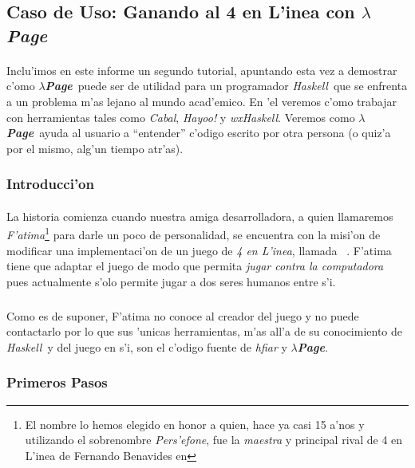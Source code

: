 \documentclass[a4paper]{article}
\newcommand{\haskell}{\textsl{Haskell}}
\newcommand{\hpage}{\textbf{\textsl{$\lambda$Page}}}
\newcommand{\cabal}{\textsl{Cabal}}
\begin{document}
\newpage
\subsection{Caso de Uso: Ganando al 4 en L'inea con \hpage}
\begin{epigraphs}
\end{epigraphs}
\paragraph{}Inclu'imos en este informe un segundo tutorial, apuntando esta vez a demostrar c'omo \hpage\ puede ser de utilidad para un programador \haskell\ que se enfrenta a un problema m'as lejano al mundo acad'emico.  En 'el veremos c'omo trabajar con herramientas tales como \cabal, \textsl{Hayoo!} y \textsl{wxHaskell}.  Veremos como \hpage\ ayuda al usuario a ``entender'' c'odigo escrito por otra persona (o quiz'a por el mismo, alg'un tiempo atr'as).
\subsubsection{Introducci'on}
\paragraph{}La historia comienza cuando nuestra amiga desarrolladora, a quien llamaremos \textsl{F'atima}\footnote{El nombre lo hemos elegido en honor a quien, hace ya casi 15 a'nos y utilizando el sobrenombre \textsl{Pers'efone}, fue la \textsl{maestra} y principal rival de 4 en L'inea de Fernando Benavides en } para darle un poco de personalidad, se encuentra con la misi'on de modificar una implementaci'on de un juego de \textsl{4 en L'inea}, llamada ~\cite{hfiar}.  F'atima tiene que adaptar el juego de modo que permita \textsl{jugar contra la computadora} pues actualmente s'olo permite jugar a dos seres humanos entre s'i.
\subparagraph{}Como es de suponer, F'atima no conoce al creador del juego y no puede contactarlo por lo que sus 'unicas herramientas, m'as all'a de su conocimiento de \haskell\ y del juego en s'i, son el c'odigo fuente de \textsl{hfiar} y \hpage.

\subsubsection{Primeros Pasos}
\end{document}
